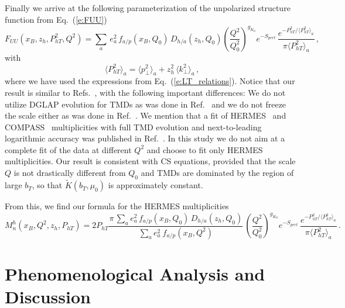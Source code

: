 \documentclass[final,3p,times,onecolumn,sort&compress,hidelinks]{elsarticle}
\newcommand\3[1]{\boldsymbol{#1}}
\begin{document}
Finally we arrive at the following parameterization of the unpolarized structure function from Eq.~(\ref{e:FUU}) 
\begin{equation}
F_{UU}(x_B,z_h,P_{hT}^2,Q^2)  =  \sum_{a} \, e_a^2 \,f_{a/p}(x_B, Q_0)\,D_{h/a}(z_h, Q_0) \left( \frac{Q^2}{Q_0^2}\right)^{g_{K_0}}e^{-S_{pert}}\,
\frac{e^{-P_{hT}^2/\langle P_{hT}^2 \rangle_a}}{\pi\langle P_{hT}^2 \rangle_a}\,, \label{e:FUU_model}
\end{equation}
with
\begin{equation}
\langle P_{hT}^2 \rangle_a = \langle p_\perp^2 \rangle_a + z_h^2\, \langle k_\perp^2 \rangle_a\,, \label{e:avg_kT}
\end{equation}
where we have used the expressions from Eq.~(\ref{e:LT_relations}).  
Notice that our result is similar to Refs.~\cite{Anselmino:2013lza,Signori:2013mda}, with the following important differences:
We do not utilize DGLAP evolution for TMDs as was done in Ref.~\cite{Anselmino:2013lza} and we do not freeze the scale either as was done in Ref.~\cite{Signori:2013mda}. We mention that a fit of HERMES~\cite{Airapetian:2012ki}  and COMPASS~\cite{Adolph:2013stb} multiplicities with full TMD evolution and next-to-leading logarithmic accuracy was published in Ref.~\cite{Bacchetta:2017gcc}. In this study we do not aim at a complete fit of the data at different $Q^2$ and choose to fit only HERMES~\cite{Airapetian:2012ki} multiplicities. Our result is consistent with CS equations, provided that the scale $Q$ is not drastically different from $Q_0$ and TMDs are dominated by the region of large $b_T$, so that $\tilde K(b_T,\mu_0)$ is approximately constant.

From this, we find our formula for the HERMES multiplicities~\cite{Airapetian:2012ki} 
\begin{equation}
M_n^h(x_B, Q^2,z_h, P_{hT}) =
2P_{hT}\frac{\pi\, \sum_{a} e_a^2 \,f_{a/p}(x_B, Q_0)\,D_{h/a}(z_h, Q_0)}
{\sum_{a} e_a^2 \> f_{a/p} (x_B,Q^2)} \,  \left( \frac{Q^2}{Q_0^2}\right)^{g_{K_0}}e^{-S_{pert}}\,
\frac{e^{-P_{hT}^2/\langle P_{hT}^2 \rangle_a}}{\pi\langle P_{hT}^2 \rangle_a}
\,. \label{e:mult_HERMES}
\end{equation}


\section{Phenomenological Analysis and Discussion}
\label{s:phenom}
\end{document}
